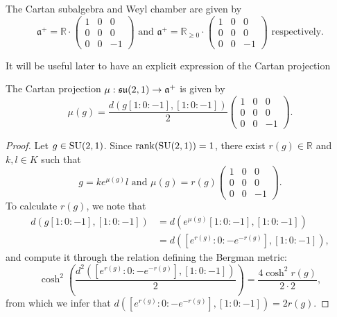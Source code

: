 \documentclass{report}
\begin{document}
The Cartan subalgebra and Weyl chamber are given by
\[
    \mathfrak a^+ = \mathbb R \cdot \begin{pmatrix}
        1 & 0 & 0\\
        0 & 0 & 0\\
        0 & 0 & -1
    \end{pmatrix} \text{ and }
\mathfrak a^+ = \mathbb R_{\geq 0} \cdot \begin{pmatrix}
    1 & 0 & 0\\
    0 & 0 & 0\\
    0 & 0 & -1
\end{pmatrix} \text{ respectively}.
\]

It will be useful later to have an explicit expression of the Cartan projection
\begin{lemma}\label{lem:cartan_projection_su_2_1}
    The Cartan projection $\mu: \operatorname{{\mathfrak{su}}}(2,1) \to \mathfrak a^+$ is given by
    \[
    \mu\left(g\right) = \frac{d(g [1:0:-1], [1:0:-1])}{2} \begin{pmatrix}
        1 & 0 & 0\\
        0 & 0 & 0\\
        0 & 0 & -1
    \end{pmatrix}.
    \]
\end{lemma}
\begin{proof}
    Let $g \in \operatorname{{\mathrm{SU}}}(2,1)$.
    Since $\operatorname{rank}(\operatorname{{\mathrm{SU}}}(2,1)) = 1$, there exist $r(g) \in \mathbb R$ and $k, l \in K$ such that
    \[
    g = k e^{\mu(g)} l \text{ and } \mu(g) = r(g) \begin{pmatrix}
        1 & 0 & 0\\
        0 & 0 & 0\\
        0 & 0 & -1
    \end{pmatrix}.
    \]
    To calculate $r(g)$, we note that 
    \begin{align*}
        d\left(g[1:0:-1], [1:0:-1]\right) &= d\left(e^{\mu(g)}[1:0:-1], [1:0:-1]\right) \\
        &= d\left([e^{r(g)}:0:-e^{-r(g)}], [1:0:-1]\right),
    \end{align*}
    and compute it through the relation defining the Bergman metric:
    \[
    \cosh^2\left( \frac{d^2\left([e^{r(g)}:0:-e^{-r(g)}], [1:0:-1]\right)}{2} \right) = \frac{4 \cosh^2{r(g)}}{2 \cdot 2},
    \]
    from which we infer that $d\left([e^{r(g)}:0:-e^{-r(g)}], [1:0:-1]\right) = 2 r(g)$.
\end{proof}
\end{document}

